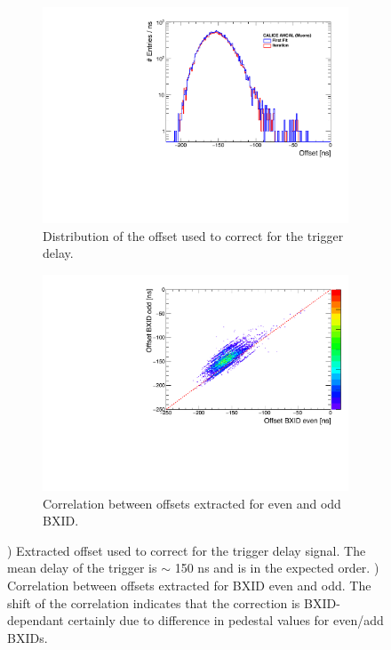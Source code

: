 \begin{figure}[htbp!]
	\begin{subfigure}[t]{0.5\textwidth}
		\centering
		\includegraphics[width=1\textwidth]{chap5/fig_AHCAL_timing/Muons/ExtractedOffsets.pdf}
		\caption{Distribution of the offset used to correct for the trigger delay.}\label{fig:offset_trigger_distribution}
	\end{subfigure}
	\hfill
	\begin{subfigure}[t]{0.5\textwidth}
		\centering
		\includegraphics[width=1\textwidth]{chap5/fig_AHCAL_timing/Muons/CorrelationOffsets_BXID.pdf}
		\caption{Correlation between offsets extracted for even and odd BXID.}\label{fig:BXID_offset}
	\end{subfigure}
	\caption{) Extracted offset used to correct for the trigger delay signal. The mean delay of the trigger is $\sim$ 150 ns and is in the expected order. ) Correlation between offsets extracted for BXID even and odd. The shift of the correlation indicates that the correction is BXID-dependant certainly due to difference in pedestal values for even/add BXIDs.}
\end{figure}

